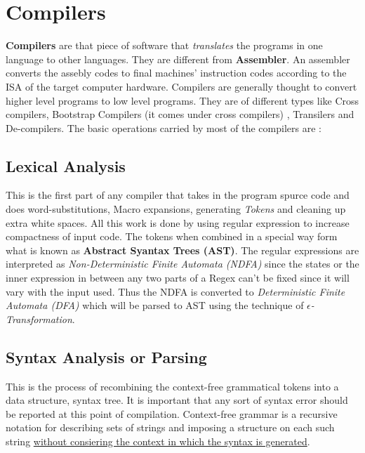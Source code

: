 \chapter{Compilers}
\graphicspath{ {./images/} }


\textbf{Compilers}\cite{dragonbook} are that piece of software that \textit{translates} the programs in one language to other languages. They are different from \textbf{Assembler}. An assembler converts the assebly codes to final machines' instruction codes according to the ISA of the target computer hardware. Compilers are generally thought to convert higher level programs to low level programs. They are of different types like Cross compilers, Bootstrap Compilers (it comes under cross compilers)
, Transilers and De-compilers. The basic operations carried by most of the compilers are :\\

\section{Lexical Analysis}
This is the first part of any compiler that takes in the program spurce code and does word-substitutions, Macro expansions, generating \textit{Tokens} and cleaning up extra white spaces. All this work is done by using regular expression to increase compactness of input code. The tokens when combined in a special way form what is known as \textbf{Abstract Syantax Trees (AST)}. The regular expressions are interpreted as \textit{Non-Deterministic Finite Automata (NDFA)} since the states or the inner expression in between any two parts of a Regex can't be fixed since it will vary with the input used. Thus the NDFA is converted to \textit{Deterministic Finite Automata (DFA)} which will be parsed to AST using the technique of \textit{$\epsilon$-Transformation}.\\

\section{Syntax Analysis or Parsing}
This is the process of recombining the context-free grammatical tokens into a data structure, syntax tree. It is important that any sort of syntax error should be reported at this point of compilation. Context-free grammar is a recursive notation for describing sets of strings and imposing a structure on each such string \underline{without consiering the context in which the syntax is generated}.\\ 

